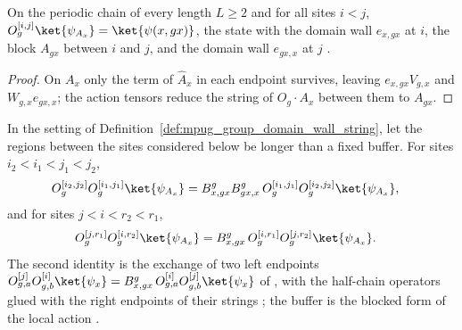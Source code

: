 \begin{lemma}
    \label{lem:mpug_group_domain_wall_string_creation}
    \leanok
    On the periodic chain of every length $L\geq2$ and for all sites $i<j$,
    $O_g^{[i,j]}\ket{\psi_{A_x}}=\ket{\psi(x,gx)}$, the state with the domain
    wall $e_{x,gx}$ at $i$, the block $A_{gx}$ between $i$ and $j$, and the
    domain wall $e_{gx,x}$ at $j$
    \cite[Section~IV.B]{GarreRubioSchuch2024DomainWall}.
\end{lemma}

\begin{proof}\leanok
    On $A_x$ only the term of $\hat A_x$ in each endpoint survives, leaving
    $e_{x,gx}V_{g,x}$ and $W_{g,x}e_{gx,x}$; the action tensors reduce the
    string of $O_g\cdot A_x$ between them to $A_{gx}$.
\end{proof}

\begin{lemma}
    \label{lem:mpug_group_domain_wall_exchange}
    \leanok
    In the setting of Definition~\ref{def:mpug_group_domain_wall_string},
    let the regions between the sites considered below be longer than a
    fixed buffer. For sites $i_2<i_1<j_1<j_2$,
    \begin{align}
        O_g^{[i_2,j_2]}O_g^{[i_1,j_1]}\ket{\psi_{A_x}}
         & =B^g_{x,gx}B^g_{gx,x}\,O_g^{[i_1,j_1]}O_g^{[i_2,j_2]}\ket{\psi_{A_x}},
        \notag
    \end{align}
    and for sites $j<i<r_2<r_1$,
    \begin{align}
        O_g^{[j,r_1]}O_g^{[i,r_2]}\ket{\psi_{A_x}}
         & =B^g_{x,gx}\,O_g^{[i,r_1]}O_g^{[j,r_2]}\ket{\psi_{A_x}}.
        \notag
    \end{align}
    The second identity is the exchange of two left endpoints
    $O^{[j]}_{g,a}O^{[i]}_{g,b}\ket{\psi_x}=B^g_{x,gx}\,O^{[i]}_{g,a}O^{[j]}_{g,b}\ket{\psi_x}$
    of \cite[Section~IV.B]{GarreRubioSchuch2024DomainWall}, with the
    half-chain operators glued with the right endpoints of their strings
    \cite{gap:gs24_domain_wall_half_string_gluing}; the buffer is the blocked
    form of the local action \cite{gap:gs24_domain_wall_nondegenerate}.
\end{lemma}

